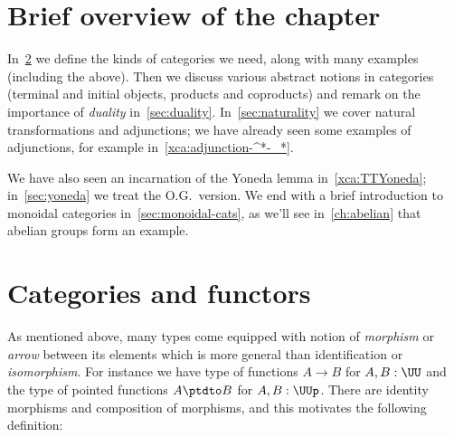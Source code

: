 \section{Brief overview of the chapter}

In~\cref{sec:categories} we define the kinds of categories we need, along with many examples (including the above).
Then we discuss various abstract notions in categories (terminal and initial objects, products and coproducts)
and remark on the importance of \emph{duality} in~\cref{sec:duality}.
In~\cref{sec:naturality} we cover natural transformations and adjunctions; we have already seen some examples of adjunctions, for example in~\cref{xca:adjunction-^*-_*}.

We have also seen an incarnation of the Yoneda lemma in~\cref{xca:TTYoneda}; in~\cref{sec:yoneda} we treat the O.G.\ version. We end with a brief introduction to monoidal categories in~\cref{sec:monoidal-cats}, as we'll see in~\cref{ch:abelian} that abelian groups form an example.

\section{Categories and functors}
\label{sec:categories}

As mentioned above, many types come equipped with notion
of \emph{morphism} or \emph{arrow} between its elements
which is more general than identification or \emph{isomorphism}.
For instance
we have type of functions $A \to B$ for $A,B:\UU$
and the type of pointed functions $A \ptdto B$ for $A,B:\UUp$.
There are identity morphisms and composition of morphisms,
and this motivates the following definition:

